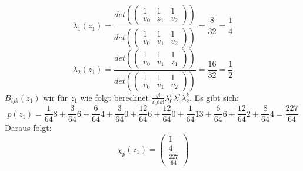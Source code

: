 $$ \lambda_1(z_1)= \frac{det(\begin{pmatrix}1 & 1 & 1\\ v_0 & z_1 & v_2\end{pmatrix})}{ det(\begin{pmatrix}1 & 1 & 1\\ v_0 & v_1 & v_2\end{pmatrix})} = \frac{8}{32} = \frac{1}{4}$$
$$ \lambda_2(z_1)= \frac{det(\begin{pmatrix}1 & 1 & 1\\ v_0 & v_1 & z_1\end{pmatrix})}{ det(\begin{pmatrix}1 & 1 & 1\\ v_0 & v_1 & v_2\end{pmatrix})} = \frac{16}{32} = \frac{1}{2}$$
$B_{ijk}(z_1)$ wir für $z_1$ wie folgt berechnet $\frac{q!}{i!j!k!} \lambda_0^i\lambda_1^j\lambda_2^k$. Es gibt sich:\\
$$p(z_1) = \frac{1}{64} 8 +\frac{3}{64} 6 +\frac{6}{64} 4 + \frac{3}{64} 0 + \frac{12}{64} 6 + \frac{12}{64} 0 + \frac{1}{64} 13 + \frac{6}{64} 6 + \frac{12}{64} 2 + \frac{8}{64} 4 = \frac{227}{64}$$
Daraus folgt: \\
$$\chi_p(z_1) = \begin{pmatrix}1\\ 4\\ \frac{227}{64}\end{pmatrix}$$

